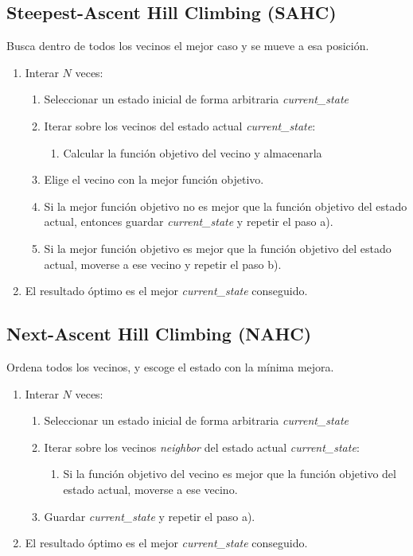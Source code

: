 \documentclass[12pt,twoside]{article}
\begin{document}
	\subsection{Steepest-Ascent Hill Climbing (SAHC)}

	Busca dentro de todos los vecinos el mejor caso y se mueve a esa posición.	
	
	\begin{enumerate}
		\item Interar $N$ veces:
		\begin{enumerate}
			\item Seleccionar un estado inicial de forma arbitraria \textit{current\_state}
			\item Iterar sobre los vecinos del estado actual \textit{current\_state}:
			\begin{enumerate}
				\item Calcular la función objetivo del vecino y almacenarla
			\end{enumerate}
			\item Elige el vecino con la mejor función objetivo.
			\item Si la mejor función objetivo no es mejor que la función objetivo del estado actual, entonces guardar \textit{current\_state} y repetir el paso a).
			\item Si la mejor función objetivo es mejor que la función objetivo del estado actual, moverse a ese vecino y repetir el paso b).
		\end{enumerate}
		\item El resultado óptimo es el mejor \textit{current\_state} conseguido.
	\end{enumerate}
	
	\subsection{Next-Ascent Hill Climbing (NAHC)}
	
	Ordena todos los vecinos, y escoge el estado con la mínima mejora.
	
	\begin{enumerate}
		\item Interar $N$ veces:
		\begin{enumerate}
			\item Seleccionar un estado inicial de forma arbitraria \textit{current\_state}
			\item Iterar sobre los vecinos \textit{neighbor} del estado actual \textit{current\_state}:
			\begin{enumerate}
				\item Si la función objetivo del vecino es mejor que la función objetivo del estado actual, moverse a ese vecino. 
			\end{enumerate}
			\item Guardar \textit{current\_state} y repetir el paso a).
		\end{enumerate}
		\item El resultado óptimo es el mejor \textit{current\_state} conseguido.
	\end{enumerate}
	
\end{document}
